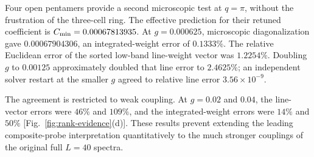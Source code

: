 Four open pentamers provide a second microscopic test at $q=\pi$, without
the frustration of the three-cell ring. The effective prediction for their
retuned coefficient is $C_{\mathrm{min}}=0.00067813935$.
At $g=0.000625$, microscopic diagonalization gave $0.00067904306$, an
integrated-weight error of $0.1333\%$. The relative Euclidean error of the
sorted low-band line-weight vector was $1.2254\%$.
Doubling $g$ to $0.00125$ approximately doubled that line error to
$2.4625\%$; an independent solver restart at the smaller $g$ agreed to
relative line error $3.56\times10^{-9}$.

The agreement is restricted to weak coupling. At $g=0.02$ and $0.04$, the
line-vector errors were $46\%$ and $109\%$, and the integrated-weight errors
were $14\%$ and $50\%$ [Fig.~\ref{fig:rank-evidence}(d)]. These results
prevent extending the leading composite-probe interpretation quantitatively
to the much stronger couplings of the original full $L=40$ spectra.
